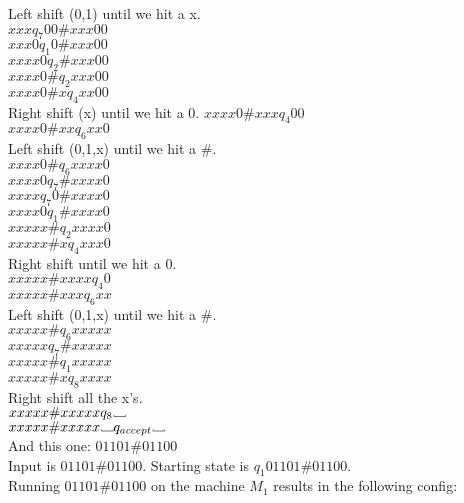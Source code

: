 \documentclass[12pt]{article}
\newcommand\Vtextvisiblespace[1][.8em]{%
	\mbox{\kern.07em\vrule height.3ex}%
	\vbox{\hrule width#1}%
	\hbox{\vrule height.3ex}}
\begin{document}
Left shift (0,1) until we hit a x.        \\
$xxx                  q_7    00 \# xxx00$ \\
$xxx0                 q_1     0 \# xxx00$ \\
$xxxx0                q_2       \# xxx00$ \\
$xxxx0 \#             q_2          xxx00$ \\
$xxxx0 \# x           q_4           xx00$ \\
Right shift (x) until we hit a 0.
$xxxx0 \# xxx         q_4             00$ \\
$xxxx0 \# xx          q_6            xx0$ \\
Left shift (0,1,x) until we hit a $\#$.  \\
$xxxx0 \#             q_6            xxxx0$ \\
$xxxx0                q_7        \#  xxxx0$ \\
$xxxx                 q_7      0 \#  xxxx0$ \\
$xxxx0                q_1        \#  xxxx0$ \\
$xxxxx \#             q_2            xxxx0$ \\
$xxxxx \# x           q_4             xxx0$ \\
Right shift until we hit a 0. \\
$xxxxx \# xxxx        q_4                0$ \\
$xxxxx \# xxx         q_6               xx$ \\
Left shift (0,1,x) until we hit a $\#$. \\
$xxxxx \#             q_6            xxxxx$ \\
$xxxxx                q_7        \#  xxxxx$ \\
$xxxxx \#             q_1            xxxxx$ \\
$xxxxx \# x           q_8             xxxx$ \\
Right shift all the x's. \\
$xxxxx \# xxxxx       q_8  \Vtextvisiblespace    $ \\
$xxxxx \# xxxxx  \Vtextvisiblespace  q_{accept} \Vtextvisiblespace $ \\

And this one: $01101\#01100$ \\

Input is $01101\#01100$. Starting state is $q_1 01101\#01100$. \\
Running $01101\#01100$ on the machine $M_1$ results in the following config: \\
\end{document}
